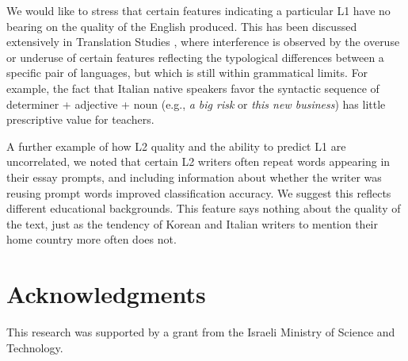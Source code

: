 \documentclass[11pt,letterpaper]{article}
\newcommand{\textnl}{\textsl}
\begin{document}
We would like to stress that certain features indicating a particular L1 have no bearing on the quality of the English produced. This has been discussed extensively in Translation Studies \citep{Toury:1995}, where interference is observed by the overuse or underuse of certain features reflecting the typological differences between a specific pair of languages, but which is still within grammatical limits. For example, the fact that Italian native speakers favor the syntactic sequence of determiner + adjective + noun (e.g., \textnl{a big risk} or \textnl{this new business}) has little prescriptive value for teachers.

A further example of how L2 quality and the ability to predict L1 are uncorrelated, we noted that certain L2 writers often repeat words appearing in their essay prompts, and including information about whether the writer was reusing prompt words improved classification accuracy. We suggest this reflects different educational backgrounds. This feature says nothing about the quality of the text, just as the tendency of Korean and Italian writers to mention their home country more often does not.

\section*{Acknowledgments}
This research was supported by a grant from the Israeli Ministry of
Science and Technology.



\end{document}
